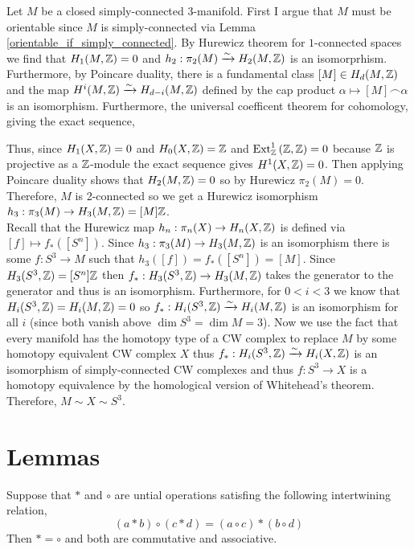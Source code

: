 \documentclass[12pt]{extarticle}
\begin{document}
Let $M$ be a closed simply-connected 3-manifold. First I argue that $M$ must be orientable since $M$ is simply-connected via Lemma \ref{orientable_if_simply_connected}.  By Hurewicz theorem for $1$-connected spaces we find that $H_1(M, \mathbb{Z}) = 0$ and $h_2 : \pi_2(M) \xrightarrow{\sim} H_2(M, \mathbb{Z})$ is an isomorprhism. Furthermore, by Poincare duality, there is a fundamental class $[M] \in H_d(M, \mathbb{Z})$ and the map $H^i(M, \mathbb{Z}) \xrightarrow{\sim} H_{d-i}(M, \mathbb{Z})$ defined by the cap product $\alpha \mapsto [M] \frown \alpha$ is an isomorphism. Furthermore, the universal coefficent theorem for cohomology, giving the exact sequence,
\begin{center}
\end{center}
Thus, since $H_1(X, \mathbb{Z}) = 0$ and $H_0(X, \mathbb{Z}) = \mathbb{Z}$ and $\mathrm{Ext}^{1}_{\mathbb{Z}} \left( \mathbb{Z}, \mathbb{Z} \right) = 0$ because $\mathbb{Z}$ is projective as a $\mathbb{Z}$-module the exact sequence gives $H^1(X, \mathbb{Z}) = 0$. Then applying Poincare duality shows that $H_2(M, \mathbb{Z}) = 0$ so by Hurewicz $\pi_2(M) = 0$. Therefore, $M$ is 2-connected so we get a Hurewicz isomorphism $h_3 : \pi_3(M) \to H_3(M, \mathbb{Z}) = [M] \mathbb{Z}$. 
\bigskip\\
Recall that the Hurewicz map $h_n : \pi_n(X) \to H_n(X, \mathbb{Z})$ is defined via $[f] \mapsto f_*([S^n])$. Since $h_3 : \pi_3(M) \to H_3(M, \mathbb{Z})$ is an isomorphism there is some $f : S^3 \to M$ such that $h_3([f]) = f_*([S^n]) = [M]$. Since $H_3(S^3, \mathbb{Z}) = [S^n] \mathbb{Z}$ then $f_* : H_3(S^3, \mathbb{Z}) \to H_3(M, \mathbb{Z})$ takes the generator to the generator and thus is an isomorphism. Furthermore, for $0 < i < 3$ we know that $H_i(S^3, \mathbb{Z}) = H_i(M, \mathbb{Z}) = 0$ so $f_* : H_i(S^3, \mathbb{Z}) \xrightarrow{\sim} H_i(M, \mathbb{Z})$ is an isomorphism for all $i$ (since both vanish above $\dim{S^3} = \dim{M} = 3$). Now we use the fact that every manifold has the homotopy type of a CW complex to replace $M$ by some homotopy equivalent CW complex $X$ thus $f_* : H_i(S^3, \mathbb{Z}) \xrightarrow{\sim} H_i(X, \mathbb{Z})$ is an isomorphism of simply-connected CW complexes and thus $f : S^3 \to X$ is a homotopy equivalence by the homological version of Whitehead's theorem. Therefore, $M \sim X \sim S^3$. 

\section{Lemmas}

\label{Eckmann_Hilton}
\begin{lemma}
Suppose that $*$ and $\circ$ are untial operations satisfing the following intertwining relation,
\[ (a * b) \circ (c * d) = (a \circ c) * (b \circ d) \]
Then $* = \circ$ and both are commutative and associative. 
\end{lemma}
\end{document}
